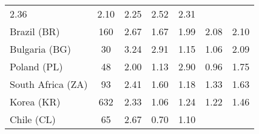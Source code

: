 \begin{table}[t]
{\begin{tabular}{lcccccc}
    \color[HTML]{000000}
    \color{black} 2.36 & {\cellcolor[HTML]{F7FBFF}} \color[HTML]{000000}
    \color{black} 2.10 & {\cellcolor[HTML]{D6E5F4}} \color[HTML]{000000}
    \color{black} 2.25 & {\cellcolor[HTML]{6AAED6}} \color[HTML]{F1F1F1}
    \color{black} 2.52 & \color{black} 2.31 \\
    Brazil (BR) & \color{black} 160 & {\cellcolor[HTML]{6AAED6}}
    \color[HTML]{F1F1F1} \color{black} 2.67 & {\cellcolor[HTML]{F7FBFF}}
    \color[HTML]{000000} \color{black} 1.67 & {\cellcolor[HTML]{D8E7F5}}
    \color[HTML]{000000} \color{black} 1.99 & {\cellcolor[HTML]{CFE1F2}}
    \color[HTML]{000000} \color{black} 2.08 & \color{black} 2.10 \\
    Bulgaria (BG) & \color{black} 30 & {\cellcolor[HTML]{6AAED6}}
    \color[HTML]{F1F1F1} \color{black} 3.24 & {\cellcolor[HTML]{89BEDC}}
    \color[HTML]{000000} \color{black} 2.91 & {\cellcolor[HTML]{F4F9FE}}
    \color[HTML]{000000} \color{black} 1.15 & {\cellcolor[HTML]{F7FBFF}}
    \color[HTML]{000000} \color{black} 1.06 & \color{black} 2.09 \\
    Poland (PL) & \color{black} 48 & {\cellcolor[HTML]{C1D9ED}}
    \color[HTML]{000000} \color{black} 2.00 & {\cellcolor[HTML]{EEF5FC}}
    \color[HTML]{000000} \color{black} 1.13 & {\cellcolor[HTML]{6AAED6}}
    \color[HTML]{F1F1F1} \color{black} 2.90 & {\cellcolor[HTML]{F7FBFF}}
    \color[HTML]{000000} \color{black} 0.96 & \color{black} 1.75 \\
    South Africa (ZA) & \color{black} 93 & {\cellcolor[HTML]{6AAED6}}
    \color[HTML]{F1F1F1} \color{black} 2.41 & {\cellcolor[HTML]{D5E5F4}}
    \color[HTML]{000000} \color{black} 1.60 & {\cellcolor[HTML]{F7FBFF}}
    \color[HTML]{000000} \color{black} 1.18 & {\cellcolor[HTML]{EBF3FB}}
    \color[HTML]{000000} \color{black} 1.33 & \color{black} 1.63 \\
    Korea (KR) & \color{black} 632 & {\cellcolor[HTML]{6AAED6}}
    \color[HTML]{F1F1F1} \color{black} 2.33 & {\cellcolor[HTML]{F7FBFF}}
    \color[HTML]{000000} \color{black} 1.06 & {\cellcolor[HTML]{E8F1FA}}
    \color[HTML]{000000} \color{black} 1.24 & {\cellcolor[HTML]{EAF3FB}}
    \color[HTML]{000000} \color{black} 1.22 & \color{black} 1.46 \\
    Chile (CL) & \color{black} 65 & {\cellcolor[HTML]{6CAED6}}
    \color[HTML]{F1F1F1}
    \color{black} 2.67 & {\cellcolor[HTML]{F7FBFF}} \color[HTML]{000000}
    \color{black} 0.70 & {\cellcolor[HTML]{E3EEF9}} \color[HTML]{000000}
    \color{black} 1.10 & {\cellcolor[HTML]{F3F8FE}} \color[HTML]{000000}

\end{tabular}}
\end{table}
